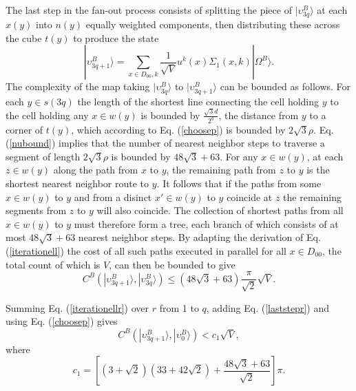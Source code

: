 \documentclass[twocolumn,amsmath,amssymb]{revtex4-1}
\begin{document}
The last step in the fan-out process consists of splitting 
the piece of $|\upsilon^B_{3q} \rangle $ at each $x(y)$ into $n(y)$ equally weighted
components, then distributing these across the cube $t(y)$ to produce the state
\begin{equation}
\label{defupsilon5}
|\upsilon^B_{3q + 1} \rangle  = \sum_{x \in D_{00}, k}\frac{1}{\sqrt{V}} u^k(x) \Sigma_1(x, k) |\Omega^B \rangle .
\end{equation}
The complexity of the map taking $|\upsilon^B_{3q} \rangle $ to $|\upsilon^B_{3q+1} \rangle $ can be bounded as follows.
For each $y \in s(3q)$ the length of the shortest line connecting
the cell holding $y$ to the cell holding any $x \in w(y)$ is
bounded by $\frac{\sqrt{3} d}{2^q}$, the distance from $y$ to a corner of $t(y)$,
which according to Eq. (\ref{choosep}) is bounded by $ 2 \sqrt{3} \rho$.
Eq. (\ref{nubound}) implies that the number of nearest neighbor
steps to traverse a segment of length $ 2 \sqrt{3} \rho$ is
bounded by $ 48 \sqrt{3} + 63$.
For any $x \in w(y)$, at each $z \in w(y)$ along the path from
$x$ to $y$, the remaining path from $z$ to $y$ is the shortest
nearest neighbor route to $y$. It follows that if the paths from
some $x \in w(y)$ to $y$ and from a disinct $x' \in w(y)$ to $y$ coincide at
$z$ the remaining segments from $z$ to $y$ will also coincide.
The collection of shortest paths
from all $x \in w(y)$ to $y$ must therefore form a tree, each branch
of which consists of at most $ 48 \sqrt{3} + 63$ nearest
neighbor steps.
By adapting the derivation of Eq. (\ref{iterationell})
the cost of all such paths executed
in parallel for all $x \in D_{00}$, the total count of which is $V$, can then be bounded
to give
\begin{equation}
  \label{laststepr}
  C^B(|\upsilon^B_{3q+1} \rangle ,|\upsilon^B_{3q} \rangle ) \le (48 \sqrt{3} + 63)\frac{ \pi}{\sqrt2} \sqrt{V}.
\end{equation}

Summing Eq. (\ref{iterationellr}) over $r$ from 1 to $q$,
adding Eq. (\ref{laststepr}) and using Eq. (\ref{choosep}) gives
\begin{equation}
  \label{finalsum}
  C^B(|\upsilon^B_{3q+1} \rangle ,|\upsilon^B_0 \rangle )  < c_1 \sqrt{V},
\end{equation}
where
\begin{equation}
  \label{finalc1}
    c_1 = [(3 + \sqrt{2})(33 + 42 \sqrt{2}) + \frac{48 \sqrt{3} + 63}{\sqrt2}] \pi. 
\end{equation}
\end{document}
